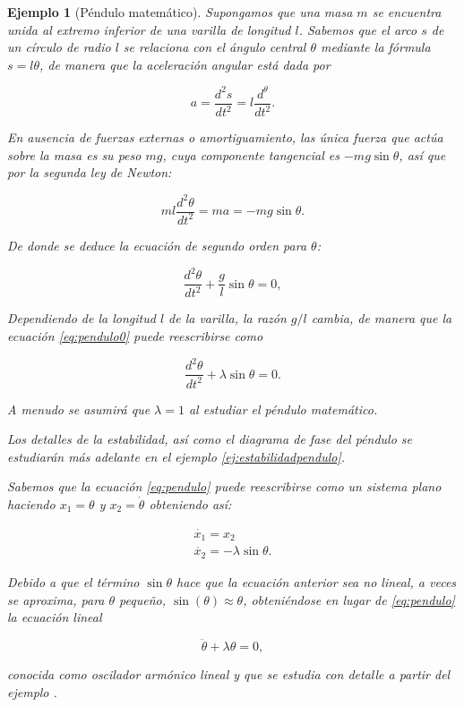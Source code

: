 \documentclass[11pt]{book}
\theoremstyle{definition}
\numberwithin{definition}{section}
\theoremstyle{theorem}
\numberwithin{theorem}{section}
\numberwithin{lemma}{section}
\numberwithin{corollary}{section}
\theoremstyle{plain}
\newtheorem{example}{Ejemplo}
\numberwithin{example}{section}
\begin{document}
\begin{example}[Péndulo matemático] \label{ej:pendulo}
Supongamos que una masa $m$ se encuentra unida al extremo inferior de una varilla de longitud $l$. Sabemos que el arco $s$ de un círculo de radio $l$ se relaciona con el ángulo central $\theta$ mediante la fórmula $s = l\theta$, de manera que la aceleración angular está dada por

$$ a = \dfrac{d^2s}{dt^2} = l \dfrac{d^\theta}{dt^2}.$$

En ausencia de fuerzas externas o amortiguamiento, las única fuerza que actúa sobre la masa es su peso $mg$, cuya componente tangencial es $-mg\sin\theta$, así que por la segunda ley de Newton:

$$ ml \dfrac{d^2\theta}{dt^2} = ma = -mg\sin\theta.$$


De donde se deduce la ecuación de segundo orden para $\theta$:

\begin{equation} \label{eq:pendulo0}
	\dfrac{d^2\theta}{dt^2} + \frac{g}{l}\sin\theta = 0,
\end{equation}

Dependiendo de la longitud $l$ de la varilla, la razón $g/l$ cambia, de manera que la ecuación \ref{eq:pendulo0} puede reescribirse como

\begin{equation} \label{eq:pendulo}
	\dfrac{d^2\theta}{dt^2} + \lambda\sin\theta = 0.
\end{equation}

A menudo se asumirá que $\lambda = 1$ al estudiar el péndulo matemático.

Los detalles de la estabilidad, así como el diagrama de fase del péndulo se estudiarán más adelante en el ejemplo \ref{ej:estabilidadpendulo}.

Sabemos que la ecuación \ref{eq:pendulo} puede reescribirse como un sistema plano haciendo $x_1 = \theta$ y $x_2 = \dot{\theta}$ obteniendo así:

\begin{equation}
	\begin{array}{l}
		\dot{x_1} = x_2 \\
		\dot{x_2} = -\lambda \sin\theta.
	\end{array}
\end{equation}

Debido a que el término $\sin\theta$ hace que la ecuación anterior sea no lineal, a veces se aproxima, para $\theta$ pequeño, $\sin(\theta) \approx \theta$, obteniéndose en lugar de \ref{eq:pendulo} la ecuación lineal

$$ \ddot{\theta} + \lambda\theta = 0,$$

conocida como oscilador armónico lineal y que se estudia con detalle a partir del ejemplo \label{ej:osciladorarmonico}.
\end{example}
\end{document}
